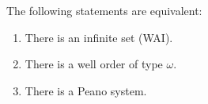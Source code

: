 \begin{lemma}
	\label{peano_is_order}
	The following statements are equivalent:
	\begin{enumerate}
		\item \label{item:WAI} There is an infinite set (WAI).
		\item \label{item:omega} There is a well order of type $\omega$.
		\item \label{item:peano} There is a Peano system.
	\end{enumerate}
\end{lemma}
